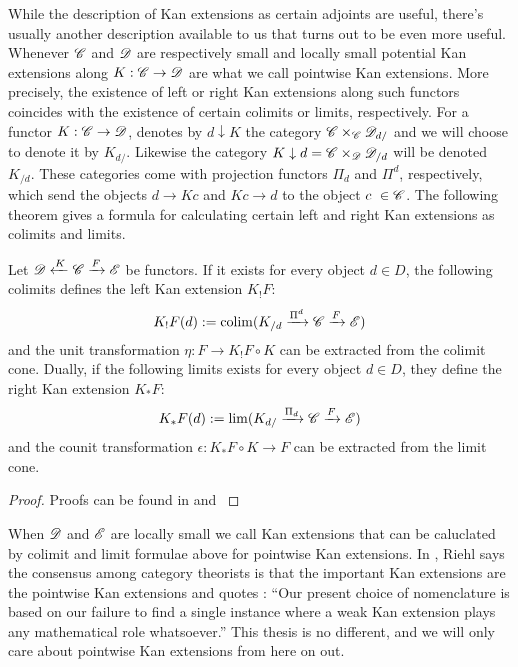 \documentclass[../../thesis.tex]{subfiles}
\begin{document}
While the description of Kan extensions as certain adjoints are useful, there's usually another description available to us that turns out to be even more useful.
Whenever $\mathscr{C}$ and $\mathscr{D}$ are respectively small and locally small potential Kan extensions along $K: \mathscr{C} \to \mathscr{D}$ are what we call pointwise Kan extensions.
More precisely, the existence of left or right Kan extensions along such functors coincides with the existence of certain colimits or limits, respectively.
For a functor $K:\mathscr{C} \to \mathscr{D}$, \cite{MacLane} denotes by $d \downarrow K$ the category $\mathscr{C} \times_{\mathscr{C}}\mathscr{D}_{d/}$ and we will choose to denote it by $K_{d/}$.
Likewise the category $K \downarrow d = \mathscr{C} \times_{\mathscr{D}}\mathscr{D}_{/d}$ will be denoted $K_{/d}$.
These categories come with projection functors $\Pi_d$ and $\Pi^d$, respectively, which send the objects $d\to Kc$ and $Kc \to d$ to the object $c \in \C$.
The following theorem gives a formula for calculating certain left and right Kan extensions as colimits and limits.
\begin{theorem}\label{ptwiseKan}
    Let $\mathscr{D} \xleftarrow{K} \mathscr{C} \xrightarrow{F} \mathscr{E}$ be functors.
    If it exists for every object $d\in D$, the following colimits defines the left Kan extension $K_!F$:
    \[
        K_!F(d) : = \operatorname{colim}(K_{/d} \xrightarrow{\Pi^d}\mathscr{C}\xrightarrow{F}\mathscr{E})
    \]
    and the unit transformation $\eta: F \to K_!F\circ K$ can be extracted from the colimit cone.
    Dually, if the following limits exists for every object $d\in D$, they define the right Kan extension $K_*F$:
    \[
        K_*F(d) : = \lim(K_{d/} \xrightarrow{\Pi_d}\mathscr{C} \xrightarrow{F} \mathscr{E})
    \]
    and the counit transformation $\epsilon: K_*F\circ K \to F$ can be extracted from the limit cone.
\end{theorem}
\begin{proof}
    Proofs can be found in \cite[Theorem 6.2.1.]{CatContext} and \cite[Theorem X.3.1.]{MacLane}
\end{proof}
When $\mathscr{D}$ and $\mathscr{E}$ are locally small we call Kan extensions that can be caluclated by colimit and limit formulae above for pointwise Kan extensions.
In \cite{CatContext}, Riehl says the consensus among category theorists is that the important Kan extensions are the pointwise Kan extensions and quotes \cite[§4]{Kelly}:
``Our present choice of nomenclature is based on our failure to find a single instance where a weak Kan extension plays any mathematical role whatsoever.''
This thesis is no different, and we will only care about pointwise Kan extensions from here on out.
\end{document}
